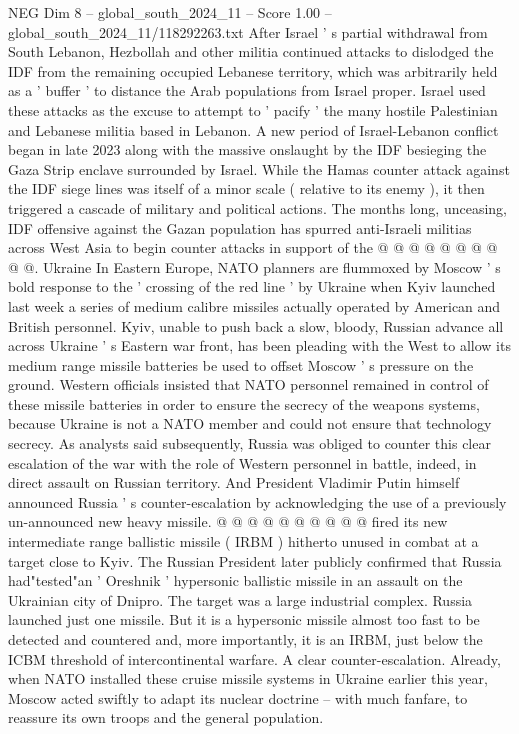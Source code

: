 \begin{textsample}{NEG Dim 8 – global\_south\_2024\_11 – Score 1.00 – global\_south\_2024\_11/118292263.txt}
After Israel ' s partial withdrawal from South Lebanon, Hezbollah and other militia continued attacks to dislodged the IDF from the remaining occupied Lebanese territory, which was arbitrarily held as a ' buffer ' to distance the Arab populations from Israel proper.
Israel used these attacks as the excuse to attempt to ' pacify ' the many hostile Palestinian and Lebanese militia based in Lebanon.
A new period of Israel-Lebanon conflict began in late 2023 along with the massive onslaught by the IDF besieging the Gaza Strip enclave surrounded by Israel.
While the Hamas counter attack against the IDF siege lines was itself of a minor scale ( relative to its enemy ), it then triggered a cascade of military and political actions.
The months long, unceasing, IDF offensive against the Gazan population has spurred anti-Israeli militias across West Asia to begin counter attacks in support of the @ @ @ @ @ @ @ @ @ @.
Ukraine In Eastern Europe, NATO planners are flummoxed by Moscow ' s bold response to the ' crossing of the red line ' by Ukraine when Kyiv launched last week a series of medium calibre missiles actually operated by American and British personnel.
Kyiv, unable to push back a slow, bloody, Russian advance all across Ukraine ' s Eastern war front, has been pleading with the West to allow its medium range missile batteries be used to offset Moscow ' s pressure on the ground.
Western officials insisted that NATO personnel remained in control of these missile batteries in order to ensure the secrecy of the weapons systems, because Ukraine is not a NATO member and could not ensure that technology secrecy.
As analysts said subsequently, Russia was obliged to counter this clear escalation of the war with the role of Western personnel in battle, indeed, in direct assault on Russian territory.
And President Vladimir Putin himself announced Russia ' s counter-escalation by acknowledging the use of a previously un-announced new heavy missile. @ @ @ @ @ @ @ @ @ @ fired its new intermediate range ballistic missile ( IRBM ) hitherto unused in combat at a target close to Kyiv.
The Russian President later publicly confirmed that Russia had"tested"an ' Oreshnik ' hypersonic ballistic missile in an assault on the Ukrainian city of Dnipro.
The target was a large industrial complex.
Russia launched just one missile.
But it is a hypersonic missile almost too fast to be detected and countered and, more importantly, it is an IRBM, just below the ICBM threshold of intercontinental warfare.
A clear counter-escalation.
Already, when NATO installed these cruise missile systems in Ukraine earlier this year, Moscow acted swiftly to adapt its nuclear doctrine -- with much fanfare, to reassure its own troops and the general population.

\end{textsample}
